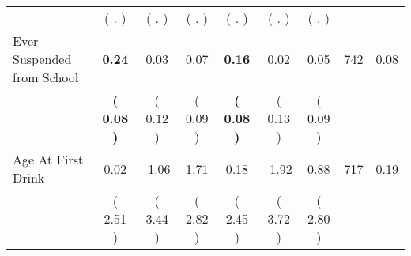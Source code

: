 \begin{tabular}{lcccccccc}
 & (        . ) & (        . ) & (        . ) & (        . ) & (        . ) & (        . ) & \\
Ever Suspended from School & \textbf{     0.24} &      0.03 &      0.07 & \textbf{     0.16} &      0.02 &      0.05 & 742 &       0.08 \\ 
 & \textbf{(     0.08 )} & (     0.12 ) & (     0.09 ) & \textbf{(     0.08 )} & (     0.13 ) & (     0.09 ) & \\
Age At First Drink &      0.02 &     -1.06 &      1.71 &      0.18 &     -1.92 &      0.88 & 717 &       0.19 \\ 
 & (     2.51 ) & (     3.44 ) & (     2.82 ) & (     2.45 ) & (     3.72 ) & (     2.80 ) & \\
\bottomrule
\end{tabular}
